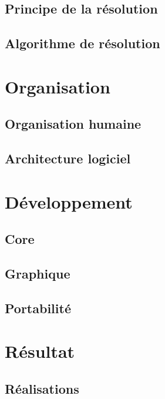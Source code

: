 \documentclass[a4paper,10pt]{report}
\begin{document}
\chapter{Principe de la résolution}

\chapter{Algorithme de résolution}


\part{Organisation}
\chapter{Organisation humaine}

\chapter{Architecture logiciel}


\part{Développement}
\chapter{Core}

\chapter{Graphique}

\chapter{Portabilité}


\part{Résultat}
\chapter{Réalisations}



\listoffigures
\lstlistoflistings

\printindex
\end{document}
